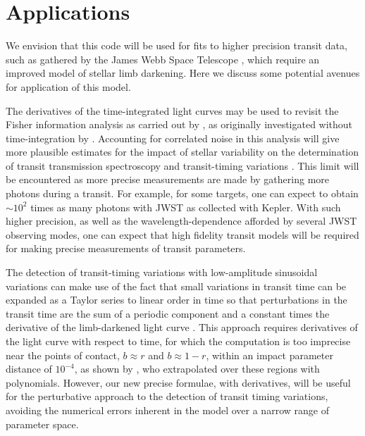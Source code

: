 \documentclass[modern,trackchanges]{aastex63}
\begin{document}

\section{Applications}
\label{sec:applications}

We envision that this code will be used for fits to higher precision
transit data, such as gathered by the James Webb Space Telescope \citep[JWST;][]{Beichman2014},
which require an improved model of stellar limb darkening.  Here we discuss
some potential avenues for application of this model.

The derivatives of the time-integrated light curves may be used to revisit the
Fisher information analysis as carried out by \citet{Price2014}, as originally
investigated without time-integration by \citet{Carter2008}.  Accounting
for correlated noise in this analysis will give more plausible estimates
for the impact of stellar variability on the determination of transit
transmission spectroscopy and transit-timing variations \citep{ForemanMackey2017}.
This limit will be encountered as more precise measurements are made by gathering
more photons during a transit.  For example, for some targets, one can expect to
obtain $\sim 10^2$ times as many photons with JWST as collected with Kepler.
With such higher precision, as well as the wavelength-dependence afforded
by several JWST observing modes, one can expect that high fidelity transit
models will be required for making precise measurements of transit parameters.

The detection of transit-timing variations with low-amplitude sinusoidal
variations can make use of the fact that small variations in transit time
can be expanded as a Taylor series to linear order in time so that perturbations
in the transit time are the sum of a periodic component and a constant
times the derivative of the limb-darkened light curve \citep{Ofir2018}.
This approach requires derivatives of the light curve with respect to
time, for which the \citet{MandelAgol2002} computation is too
imprecise near the points of contact, $b \approx r$ and $b \approx 1-r$,
within an impact parameter distance of $10^{-4}$, as shown by \citet{Ofir2018},
who extrapolated over these regions with polynomials.
However, our new precise formulae, with derivatives, will be useful
for the perturbative approach to the detection of transit timing
variations, avoiding the numerical errors inherent in the \citet{MandelAgol2002}
model over a narrow range of parameter space.
\end{document}

